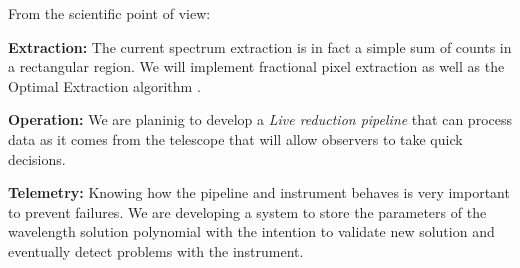 \documentclass[a0paper,portrait]{baposter}
\begin{document}
\begin{poster}
{\vspace{.1in}
From the scientific point of view:

{\bf Extraction:} The current spectrum extraction is in fact a simple sum of counts
in a rectangular region. We will implement fractional pixel extraction as well as 
the Optimal Extraction algorithm \cite{1989PASP..101.1032M} \cite{1986PASP...98..609H}.

{\bf Operation:} We are planinig to develop a \emph{Live reduction pipeline} that 
can process data as it comes from the telescope that will allow observers to take quick decisions.

{\bf Telemetry:} Knowing how the pipeline and instrument behaves is very important to prevent failures. We
are developing a system to store the parameters of the wavelength solution polynomial
with the intention to validate new solution and eventually detect problems with the instrument.

}



\end{poster}
\end{document}
